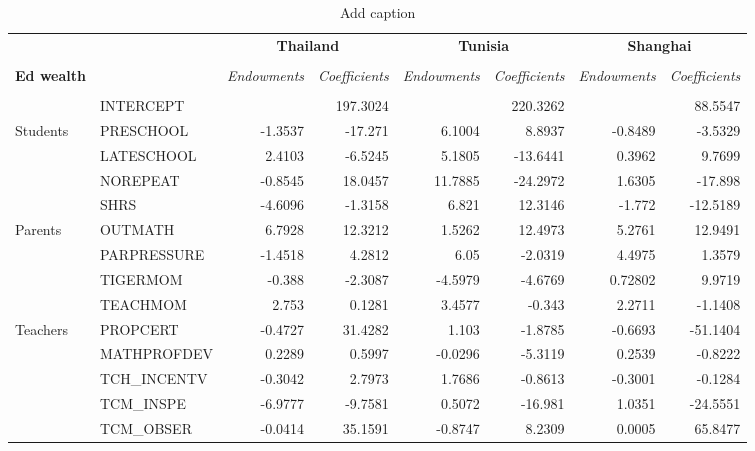\documentclass[10pt]{article}
\begin{document}
	
	\begin{table}[htbp]
		\footnotesize
		\def\arraystretch{1}
		\def\tabcolsep{4}
		\centering
		\caption{Add caption}
		\begin{tabular}{llrrrrrr}
    \toprule
    \midrule
          &       & \multicolumn{2}{c}{\textbf{Thailand}} & \multicolumn{2}{c}{\textbf{Tunisia}} & \multicolumn{2}{c}{\textbf{Shanghai}} \\
    \cline{3-8} \\
    \textbf{Ed wealth} &       & \multicolumn{1}{c}{\textit{Endowments}} & \multicolumn{1}{c}{\textit{Coefficients}} & \multicolumn{1}{c}{\textit{Endowments}} & \multicolumn{1}{c}{\textit{Coefficients}} & \multicolumn{1}{c}{\textit{Endowments}} & \multicolumn{1}{c}{\textit{Coefficients}} \\[0.4em]
        \cline{3-8} \\
    \textbf{} & INTERCEPT &       & 197.3024 &       & 220.3262 &       & 88.5547 \\[0.4em]
    Students & PRESCHOOL & -1.3537 & -17.271 & 6.1004 & 8.8937 & -0.8489 & -3.5329 \\[0.4em]
          & LATESCHOOL & 2.4103 & -6.5245 & 5.1805 & -13.6441 & 0.3962 & 9.7699 \\[0.4em]
          & NOREPEAT & -0.8545 & 18.0457 & 11.7885 & -24.2972 & 1.6305 & -17.898 \\[0.4em]
          & SHRS  & -4.6096 & -1.3158 & 6.821 & 12.3146 & -1.772 & -12.5189 \\[0.4em]
    Parents & OUTMATH & 6.7928 & 12.3212 & 1.5262 & 12.4973 & 5.2761 & 12.9491 \\[0.4em]
          & PARPRESSURE  & -1.4518 & 4.2812 & 6.05  & -2.0319 & 4.4975 & 1.3579 \\[0.4em]
          & TIGERMOM & -0.388 & -2.3087 & -4.5979 & -4.6769 & 0.72802 & 9.9719 \\[0.4em]
          & TEACHMOM & 2.753 & 0.1281 & 3.4577 & -0.343 & 2.2711 & -1.1408 \\[0.4em]
    Teachers & PROPCERT & -0.4727 & 31.4282 & 1.103 & -1.8785 & -0.6693 & -51.1404 \\[0.4em]
          & MATHPROFDEV & 0.2289 & 0.5997 & -0.0296 & -5.3119 & 0.2539 & -0.8222 \\[0.4em]
          & TCH\_INCENTV & -0.3042 & 2.7973 & 1.7686 & -0.8613 & -0.3001 & -0.1284 \\[0.4em]
          & TCM\_INSPE & -6.9777 & -9.7581 & 0.5072 & -16.981 & 1.0351 & -24.5551 \\[0.4em]
          & TCM\_OBSER & -0.0414 & 35.1591 & -0.8747 & 8.2309 & 0.0005 & 65.8477 \\[0.4em]

\end{tabular}
\end{table}
\end{document}
